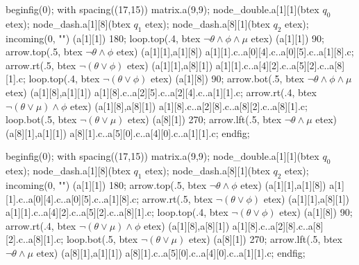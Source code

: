 \stopsubsection


    beginfig(0);
        with spacing((17,15)) matrix.a(9,9);
        node_double.a[1][1](btex $q_0$ etex);
        node_dash.a[1][8](btex $q_1$ etex);
        node_dash.a[8][1](btex $q_2$ etex);
        incoming(0, "") (a[1][1]) 180;
        loop.top(.4, btex \small \;$ \neg \theta \wedge \phi \wedge \mu$ etex) (a[1][1]) 90;
        arrow.top(.5, btex \small $ \neg \theta \wedge \phi $ etex) (a[1][1],a[1][8]) a[1][1].c..a[0][4].c..a[0][5].c..a[1][8].c;
        arrow.rt(.5, btex \small $ \neg (\theta \vee \phi)$ etex) (a[1][1],a[8][1]) a[1][1].c..a[4][2].c..a[5][2].c..a[8][1].c;
        loop.top(.4, btex \small \;$ \neg (\theta \vee \phi) $ etex) (a[1][8]) 90;
        arrow.bot(.5, btex \small $ \neg \theta \wedge \phi \wedge \mu $ etex) (a[1][8],a[1][1]) a[1][8].c..a[2][5].c..a[2][4].c..a[1][1].c;
        arrow.rt(.4, btex \small \qquad$ \neg (\theta \vee \mu) \wedge \phi $ etex) (a[1][8],a[8][1]) a[1][8].c..a[2][8].c..a[8][2].c..a[8][1].c;
        loop.bot(.5, btex \small \;$ \neg (\theta \vee \mu) $ etex) (a[8][1]) 270;
        arrow.lft(.5, btex \small $ \neg \theta \wedge \mu $ etex) (a[8][1],a[1][1]) a[8][1].c..a[5][0].c..a[4][0].c..a[1][1].c;
    endfig;
\stopreusableMPgraphic

    beginfig(0);
        with spacing((17,15)) matrix.a(9,9);
        node_double.a[1][1](btex $q_0$ etex);
        node_dash.a[1][8](btex $q_1$ etex);
        node_dash.a[8][1](btex $q_2$ etex);
        incoming(0, "") (a[1][1]) 180;
        arrow.top(.5, btex \small $ \neg \theta \wedge \phi $ etex) (a[1][1],a[1][8]) a[1][1].c..a[0][4].c..a[0][5].c..a[1][8].c;
        arrow.rt(.5, btex \small $ \neg (\theta \vee \phi)$ etex) (a[1][1],a[8][1]) a[1][1].c..a[4][2].c..a[5][2].c..a[8][1].c;
        loop.top(.4, btex \small \;$ \neg (\theta \vee \phi) $ etex) (a[1][8]) 90;
        arrow.rt(.4, btex \small \qquad$ \neg (\theta \vee \mu) \wedge \phi $ etex) (a[1][8],a[8][1]) a[1][8].c..a[2][8].c..a[8][2].c..a[8][1].c;
        loop.bot(.5, btex \small \;$ \neg (\theta \vee \mu) $ etex) (a[8][1]) 270;
        arrow.lft(.5, btex \small $ \neg \theta \wedge \mu $ etex) (a[8][1],a[1][1]) a[8][1].c..a[5][0].c..a[4][0].c..a[1][1].c;
    endfig;
\stopreusableMPgraphic

